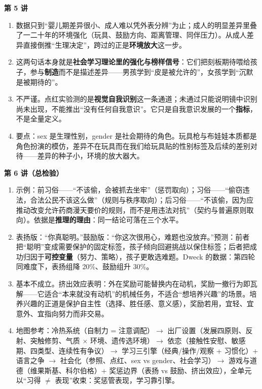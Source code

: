 \documentclass[UTF8,a4paper,11pt]{ctexart}
\begin{document}
\textbf{第 5 讲}
\begin{enumerate}
  \item 数据只到“婴儿期差异很小、成人难以凭外表分辨”为止；成人的明显差异里叠了一二十年的环境强化（玩具、鼓励方向、距离管理、同伴压力）。从成人差异直接倒推“生理决定”，跨过的正是\textbf{环境放大}这一步。
  \item 这两句话本身就是\textbf{社会学习理论里的强化与榜样信号}：它们把刻板期待喂给孩子，参与\textbf{制造}而不是描述差异——男孩学到“皮是被允许的”，女孩学到“沉默是被期待的”。
  \item 不严谨。点红实验测的是\textbf{视觉自我识别}这一条通道；未通过只能说明镜中识别尚未出现，不能推出“没有任何自我意识”。它只是自我意识发展的一个\textbf{指标}，不是全量定义。
  \item 要点：sex 是生理性别，gender 是社会期待的角色。玩具枪与布娃娃本质都是角色扮演的模仿，差异不在玩具而在我们给玩具贴的性别标签及后续的差别对待——差异的种子小，环境的放大器大。
\end{enumerate}

\textbf{第 6 讲（总检验）}
\begin{enumerate}
  \item 示例：前习俗——“不该偷，会被抓去坐牢”（惩罚取向）；习俗——“偷窃违法，合法公民不该这么做”（规则与秩序取向）；后习俗——“不该偷，因为应推动改变允许药商漫天要价的规则，而不是用违法对抗”（契约与普遍原则取向）。依据是\textbf{推理的理由}：同一结论可落在三个水平。
  \item 表扬版：“你真聪明。”鼓励版：“你这次很用心，难题也没放弃。”预测：前者把“聪明”变成需要保护的固定标签，孩子倾向回避挑战以保住标签；后者把成功归因于\textbf{可控变量}（努力、策略），孩子更敢选难题。Dweck 的数据：第四轮同难度下，表扬组降 20\%、鼓励组升 30\%。
  \item 基本不成立。挤出效应表明：外在奖励可能替换内在动机，奖励一撤行为即瓦解——它适合“本来就没有动机”的机械任务，不适合“想培养兴趣”的场景。培养兴趣的正道是保护自主性（选择、胜任感、意义感），奖励若用，宜轻、宜意外、宜指向努力而非交易。
  \item 地图参考：冷热系统（自制力 = 注意调配）$\rightarrow$ 出厂设置（发展四原则、反射、突触修剪、气质 $\times$ 环境、遗传选环境）$\rightarrow$ 依恋（接触性安慰、敏感期、四类型、连续性有争议）$\rightarrow$ 学习三引擎（经典/操作/观察 + 习惯化）+ 语言之争 $\rightarrow$ 社会化（参照、点红、sex vs gender、社会学习）$\rightarrow$ 游戏与道德（维果斯基、科尔伯格）+ 奖惩边界（表扬 vs 鼓励、挤出效应），全单元以“习得 $\neq$ 表现”收束：奖惩管表现，学习靠引擎。
\end{enumerate}
\end{document}
